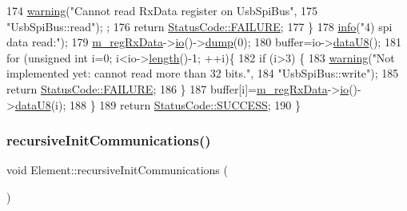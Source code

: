 \begin{DoxyCode}
174     \hyperlink{classObject_a65cd4fda577711660821fd2cd5a3b4c9}{warning}(\textcolor{stringliteral}{"Cannot read RxData register on UsbSpiBus"},
175         \textcolor{stringliteral}{"UsbSpiBus::read"});  ;
176     \textcolor{keywordflow}{return} \hyperlink{classStatusCode_a6f565cbeadc76d14c72f047e5e85eb4ba3da73d4c469762eb9d3c960368252b26}{StatusCode::FAILURE};
177   \}
178   \hyperlink{classObject_a644fd329ea4cb85f54fa6846484b84a8}{info}(\textcolor{stringliteral}{"4) spi data read:"});
179   \hyperlink{classUsbSpiBus_ab59fb8ae67f97818d8cc6e0daf324cf6}{m\_regRxData}->\hyperlink{classIOobject_af04fb94137c3d86849f478ac5afab5d1}{io}()->\hyperlink{classIOdata_a208e24222bf2044a4ff8bbb1a6bdc13b}{dump}(0);
180   buffer=io->\hyperlink{classIOdata_a75e9c318dbac3a39402179070943d4bc}{dataU8}();
181   \textcolor{keywordflow}{for} (\textcolor{keywordtype}{unsigned} \textcolor{keywordtype}{int} i=0; i<io->\hyperlink{classIOdata_abb40e71ce0290832a24857b4a1e7b1a3}{length}()-1; ++i)\{
182     \textcolor{keywordflow}{if} (i>3) \{
183       \hyperlink{classObject_a65cd4fda577711660821fd2cd5a3b4c9}{warning}(\textcolor{stringliteral}{"Not implemented yet: cannot read more than 32 bits."},
184           \textcolor{stringliteral}{"UsbSpiBus::write"});
185       \textcolor{keywordflow}{return} \hyperlink{classStatusCode_a6f565cbeadc76d14c72f047e5e85eb4ba3da73d4c469762eb9d3c960368252b26}{StatusCode::FAILURE};
186     \}
187     buffer[i]=\hyperlink{classUsbSpiBus_ab59fb8ae67f97818d8cc6e0daf324cf6}{m\_regRxData}->\hyperlink{classIOobject_af04fb94137c3d86849f478ac5afab5d1}{io}()->\hyperlink{classIOdata_a75e9c318dbac3a39402179070943d4bc}{dataU8}(i);    
188   \}
189   \textcolor{keywordflow}{return} \hyperlink{classStatusCode_a6f565cbeadc76d14c72f047e5e85eb4badd0da38d3ba0d922efd1f4619bc37ad8}{StatusCode::SUCCESS};
190 \}
\end{DoxyCode}
\mbox{\label{classElement_a82119ed37dff76508a2746a853ec35ba}} 
\subsubsection{\texorpdfstring{recursive\+Init\+Communications()}{recursiveInitCommunications()}}
{\footnotesize\ttfamily void Element\+::recursive\+Init\+Communications (\begin{DoxyParamCaption}{ }\end{DoxyParamCaption})\hspace{0.3cm}{\ttfamily [inherited]}}

